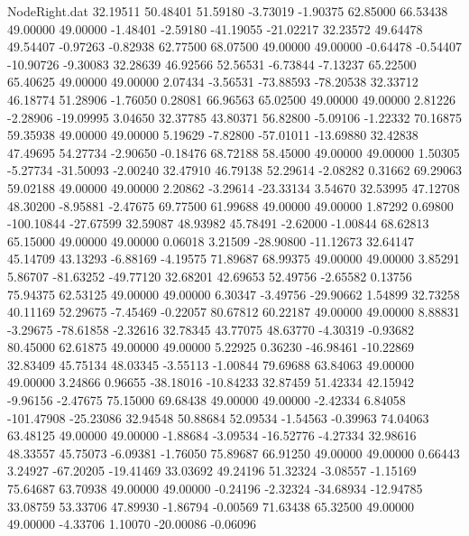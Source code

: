\begin{filecontents}{NodeRight.dat}
  32.19511   50.48401   51.59180    -3.73019   -1.90375   62.85000   66.53438   49.00000   49.00000   -1.48401   -2.59180  -41.19055  -21.02217
  32.23572   49.64478   49.54407    -0.97263   -0.82938   62.77500   68.07500   49.00000   49.00000   -0.64478   -0.54407  -10.90726   -9.30083
  32.28639   46.92566   52.56531    -6.73844   -7.13237   65.22500   65.40625   49.00000   49.00000    2.07434   -3.56531  -73.88593  -78.20538
  32.33712   46.18774   51.28906    -1.76050    0.28081   66.96563   65.02500   49.00000   49.00000    2.81226   -2.28906  -19.09995    3.04650
  32.37785   43.80371   56.82800    -5.09106   -1.22332   70.16875   59.35938   49.00000   49.00000    5.19629   -7.82800  -57.01011  -13.69880
  32.42838   47.49695   54.27734    -2.90650   -0.18476   68.72188   58.45000   49.00000   49.00000    1.50305   -5.27734  -31.50093   -2.00240
  32.47910   46.79138   52.29614    -2.08282    0.31662   69.29063   59.02188   49.00000   49.00000    2.20862   -3.29614  -23.33134    3.54670
  32.53995   47.12708   48.30200    -8.95881   -2.47675   69.77500   61.99688   49.00000   49.00000    1.87292    0.69800 -100.10844  -27.67599
  32.59087   48.93982   45.78491    -2.62000   -1.00844   68.62813   65.15000   49.00000   49.00000    0.06018    3.21509  -28.90800  -11.12673
  32.64147   45.14709   43.13293    -6.88169   -4.19575   71.89687   68.99375   49.00000   49.00000    3.85291    5.86707  -81.63252  -49.77120
  32.68201   42.69653   52.49756    -2.65582    0.13756   75.94375   62.53125   49.00000   49.00000    6.30347   -3.49756  -29.90662    1.54899
  32.73258   40.11169   52.29675    -7.45469   -0.22057   80.67812   60.22187   49.00000   49.00000    8.88831   -3.29675  -78.61858   -2.32616
  32.78345   43.77075   48.63770    -4.30319   -0.93682   80.45000   62.61875   49.00000   49.00000    5.22925    0.36230  -46.98461  -10.22869
  32.83409   45.75134   48.03345    -3.55113   -1.00844   79.69688   63.84063   49.00000   49.00000    3.24866    0.96655  -38.18016  -10.84233
  32.87459   51.42334   42.15942    -9.96156   -2.47675   75.15000   69.68438   49.00000   49.00000   -2.42334    6.84058 -101.47908  -25.23086
  32.94548   50.88684   52.09534    -1.54563   -0.39963   74.04063   63.48125   49.00000   49.00000   -1.88684   -3.09534  -16.52776   -4.27334
  32.98616   48.33557   45.75073    -6.09381   -1.76050   75.89687   66.91250   49.00000   49.00000    0.66443    3.24927  -67.20205  -19.41469
  33.03692   49.24196   51.32324    -3.08557   -1.15169   75.64687   63.70938   49.00000   49.00000   -0.24196   -2.32324  -34.68934  -12.94785
  33.08759   53.33706   47.89930    -1.86794   -0.00569   71.63438   65.32500   49.00000   49.00000   -4.33706    1.10070  -20.00086   -0.06096

\end{filecontents}
